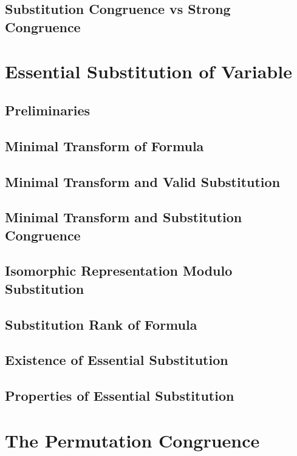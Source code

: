     \subsection{Substitution Congruence vs Strong Congruence}
      
\section{Essential Substitution of Variable}
    \subsection{Preliminaries}
      
    \subsection{Minimal Transform of Formula}
      
    \subsection{Minimal Transform and Valid Substitution}
      
    \subsection{Minimal Transform and Substitution Congruence}
      
    \subsection{Isomorphic Representation Modulo Substitution}
      
    \subsection{Substitution Rank of Formula}
      
    \subsection{Existence of Essential Substitution}
      
    \subsection{Properties of Essential Substitution}
      
\section{The Permutation Congruence}
